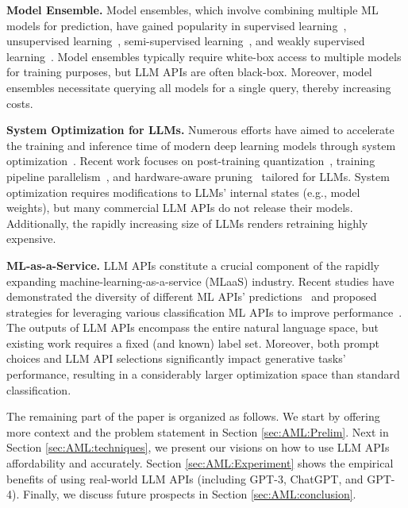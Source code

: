 \documentclass{article}
\begin{document}
\textbf{Model Ensemble.} Model ensembles, which involve combining multiple ML models for prediction, have gained popularity in supervised learning~\cite{viola2004robust, friedman2002stochastic}, unsupervised learning~\cite{yang2014exploring}, semi-supervised learning~\cite{gupta2022semi}, and weakly supervised learning~\cite{diba2017weakly}. Model ensembles typically require white-box access to multiple models for training purposes, but LLM APIs are often black-box. Moreover, model ensembles necessitate querying all models for a single query, thereby increasing costs.

\textbf{System Optimization for LLMs.} Numerous efforts have aimed to accelerate the training and inference time of modern deep learning models through system optimization~\cite{han2015deep,cai2017deep,cass2019taking,jia2019beyond,recht2011hogwild}. Recent work focuses on post-training quantization~\cite{bai2022towards, yao2023comprehensive,xiao2022smoothquant}, training pipeline parallelism~\cite{li2021terapipe}, and hardware-aware pruning~\cite{kurtic2023ziplm} tailored for LLMs. System optimization requires modifications to LLMs' internal states (e.g., model weights), but many commercial LLM APIs do not release their models. Additionally, the rapidly increasing size of LLMs renders retraining highly expensive.

\textbf{ML-as-a-Service.} LLM APIs constitute a crucial component of the rapidly expanding machine-learning-as-a-service (MLaaS) industry. Recent studies have demonstrated the diversity of different ML APIs' predictions~\cite{buolamwini2018gender,koenecke2020racial,chen2021did} and proposed strategies for leveraging various classification ML APIs to improve performance~\cite{chen2020frugalml,chen2022efficient}. The outputs of LLM APIs encompass the entire natural language space, but existing work requires a fixed (and known) label set. Moreover, both prompt choices and LLM API selections significantly impact generative tasks' performance, resulting in a considerably larger optimization space than standard classification.

The remaining part of the paper is organized as follows.
We start by offering more context and the problem statement in Section \ref{sec:AML:Prelim}.
Next in Section \ref{sec:AML:techniques}, we present our visions on how to use LLM  APIs affordability and accurately.
Section \ref{sec:AML:Experiment} shows the empirical benefits of \systemFGPT{}  using real-world LLM APIs (including GPT-3, ChatGPT, and GPT-4). Finally, we discuss future prospects in Section \ref{sec:AML:conclusion}.
\end{document}
